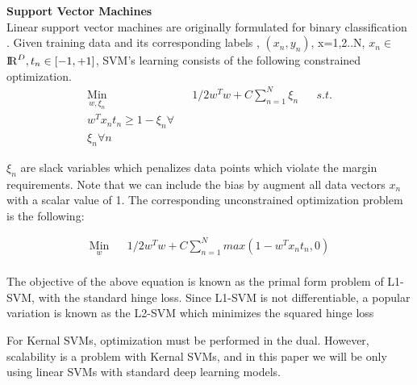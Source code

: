 \documentclass[preprint,12pt]{elsarticle}
\begin{document}
\textbf{Support Vector Machines}\\

Linear support vector machines are originally formulated for binary classification \cite{burges1998tutorial}. Given training data and its corresponding labels , \ensuremath{(x_n,y_n)}, x=1,2..N, ${x_n \in}$ ${\rm I\!R}^D, t_n\in[{-1,+1}]$, SVM's learning consists of the following constrained optimization.\\

\begin{equation*}
\begin{aligned}
 \underset{w, \xi_n}{\text{Min}}
 & & 1/2 w^Tw + C\sum_{n=1}^{N} \xi_n  & & s.t.\\
 w^Tx_nt_n \geq 1 -\xi_n \forall \\
 \xi_n \forall n
\end{aligned}
\end{equation*}



$\xi_n$ are slack variables which penalizes data points
which violate the margin requirements. Note that we
can include the bias by augment all data vectors $x_n$
with a scalar value of 1. The corresponding unconstrained
optimization problem is the following:



\begin{equation*}
\begin{aligned}
 \underset{w}{\text{Min}}
 & & 1/2 w^Tw + C\sum_{n=1}^{N} max(1-w^Tx_nt_n,0)\\
\end{aligned}
\end{equation*}

The objective of the above equation is known as the primal form
problem of L1-SVM, with the standard hinge loss.
Since L1-SVM is not differentiable, a popular variation
is known as the L2-SVM which minimizes the squared
hinge loss

For Kernal SVMs, optimization must be performed in
the dual. However, scalability is a problem with Kernal
SVMs, and in this paper we will be only using
linear SVMs with standard deep learning models.
\end{document}

